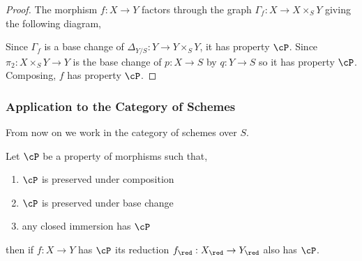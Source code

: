 \documentclass[12pt]{article}
\begin{document}
\begin{proof}
The morphism $f : X \to Y$ factors through the graph $\Gamma_f : X \to X \times_S Y$ giving the following diagram,
\begin{center}
\end{center}
Since $\Gamma_f$ is a base change of $\Delta_{Y/S} : Y \to Y \times_S Y$, it has property $\cP$. Since $\pi_2 : X \times_S Y \to Y$ is the base change of $p : X \to S$ by $q : Y \to S$ so it has property $\cP$. Composing, $f$ has property $\cP$.
\end{proof}

\subsubsection{Application to the Category of Schemes}

\begin{rmk}
From now on we work in the category of schemes over $S$.
\end{rmk}

\begin{prop}
Let $\cP$ be a property of morphisms such that,
\begin{enumerate}
\item $\cP$ is preserved under composition
\item $\cP$ is preserved under base change
\item any closed immersion has $\cP$
\end{enumerate} 
then if $f : X \to Y$ has $\cP$ its reduction $f_{\red} : X_{\red} \to Y_{\red}$ also has $\cP$.
\end{prop}
\end{document}
